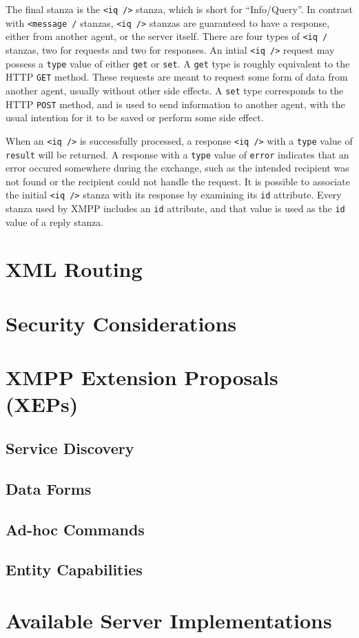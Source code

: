 The final stanza is the \texttt{<iq />} stanza, which is short for
``Info/Query''. In contrast with \texttt{<message /} stanzas, \texttt{<iq
/>} stanzas are guaranteed to have a response, either from another agent, or
the server itself. There are four types of \texttt{<iq /} stanzas, two for
requests and two for responses. An intial \texttt{<iq />} request may possess a
\texttt{type} value of either \texttt{get} or \texttt{set}. A \texttt{get} type
is roughly equivalent to the HTTP \texttt{GET} method. These requests are meant
to request some form of data from another agent, usually without other side
effects. A \texttt{set} type corresponds to the HTTP \texttt{POST} method, and
is used to send information to another agent, with the usual intention for it to
be saved or perform some side effect.

When an \texttt{<iq />} is successfully processed, a response \texttt{<iq />}
with a \texttt{type} value of \texttt{result} will be returned. A response
with a \texttt{type} value of \texttt{error} indicates that an error occured
somewhere during the exchange, such as the intended recipient was not found or
the recipient could not handle the request. It is possible to associate the
initial \texttt{<iq />} stanza with its response by examining its \texttt{id}
attribute. Every stanza used by XMPP includes an \texttt{id} attribute, and that
value is used as the \texttt{id} value of a reply stanza.

\section{XML Routing}

\section{Security Considerations}

\section{XMPP Extension Proposals (XEPs)}

\subsection{Service Discovery}

\subsection{Data Forms}

\subsection{Ad-hoc Commands}

\subsection{Entity Capabilities}

\section{Available Server Implementations}
